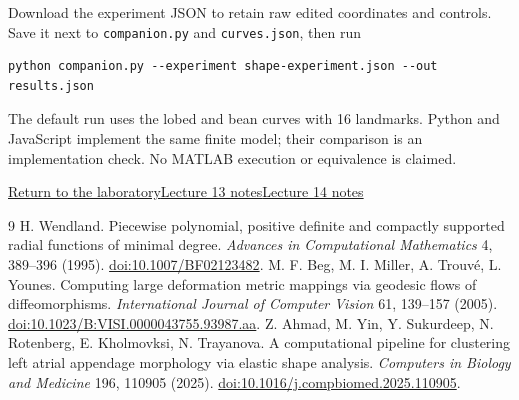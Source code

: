 \documentclass[11pt]{article}
\begin{document}
Download the experiment JSON to retain raw edited coordinates and controls. Save it next to \texttt{companion.py} and \texttt{curves.json}, then run
\begin{verbatim}
python companion.py --experiment shape-experiment.json --out results.json
\end{verbatim}
The default run uses the lobed and bean curves with 16 landmarks. Python and JavaScript implement the same finite model; their comparison is an implementation check. No MATLAB execution or equivalence is claimed.

\noindent\href{index.html}{Return to the laboratory}\quad\href{../../m13/notes.pdf}{Lecture 13 notes}\quad\href{../../m14/notes.pdf}{Lecture 14 notes}
\begin{thebibliography}{9}
 H. Wendland. Piecewise polynomial, positive definite and compactly supported radial functions of minimal degree. \emph{Advances in Computational Mathematics} 4, 389--396 (1995). \href{https://doi.org/10.1007/BF02123482}{doi:10.1007/BF02123482}.
 M. F. Beg, M. I. Miller, A. Trouv\'e, L. Younes. Computing large deformation metric mappings via geodesic flows of diffeomorphisms. \emph{International Journal of Computer Vision} 61, 139--157 (2005). \href{https://doi.org/10.1023/B:VISI.0000043755.93987.aa}{doi:10.1023/B:VISI.0000043755.93987.aa}.
 Z. Ahmad, M. Yin, Y. Sukurdeep, N. Rotenberg, E. Kholmovksi, N. Trayanova. A computational pipeline for clustering left atrial appendage morphology via elastic shape analysis. \emph{Computers in Biology and Medicine} 196, 110905 (2025). \href{https://doi.org/10.1016/j.compbiomed.2025.110905}{doi:10.1016/j.compbiomed.2025.110905}.
\end{thebibliography}
\end{document}
